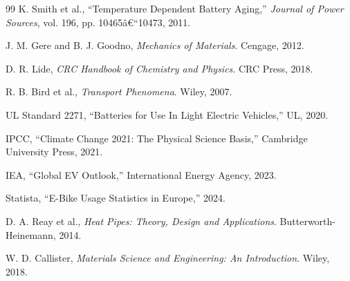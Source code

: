 ﻿\documentclass[a4paper,12pt]{article}
\theoremstyle{definition}
\begin{document}
\begin{thebibliography}{99}
K. Smith et al., ``Temperature Dependent Battery Aging,'' \textit{Journal of Power Sources}, vol. 196, pp. 10465â€“10473, 2011.

J. M. Gere and B. J. Goodno, \textit{Mechanics of Materials}. Cengage, 2012.

D. R. Lide, \textit{CRC Handbook of Chemistry and Physics}. CRC Press, 2018.

R. B. Bird et al., \textit{Transport Phenomena}. Wiley, 2007.

UL Standard 2271, ``Batteries for Use In Light Electric Vehicles,'' UL, 2020.

IPCC, ``Climate Change 2021: The Physical Science Basis,'' Cambridge University Press, 2021.

IEA, ``Global EV Outlook,'' International Energy Agency, 2023.

Statista, ``E-Bike Usage Statistics in Europe,'' 2024.

D. A. Reay et al., \textit{Heat Pipes: Theory, Design and Applications}. Butterworth-Heinemann, 2014.

W. D. Callister, \textit{Materials Science and Engineering: An Introduction}. Wiley, 2018.

\end{thebibliography}
\end{document}
